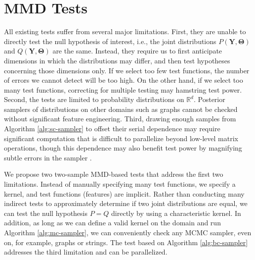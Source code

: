 \documentclass[a4paper,11pt]{article}
\begin{document}
\section{MMD Tests}
All existing tests suffer from several major limitations. First, they are unable to directly test the null hypothesis of interest, i.e., the joint distributions $P(\mathbf{Y}, \mathbf{\Theta})$ and $Q(\mathbf{Y}, \mathbf{\Theta})$ are the same. Instead, they require us to first anticipate dimensions in which the distributions may differ, and then test hypotheses concerning those dimensions only. If we select too few test functions, the number of errors we cannot detect will be too high. On the other hand, if we select too many test functions, correcting for multiple testing may hamstring test power. Second, the tests are limited to probability distributions on $\mathbb{R}^{d}$. Posterior samplers of distributions on other domains such as graphs cannot be checked without significant feature engineering. Third, drawing enough samples from Algorithm \ref{alg:sc-sampler} to offset their serial dependence may require significant computation that is difficult to parallelize beyond low-level matrix operations, though this dependence may also benefit test power by magnifying subtle errors in the sampler \cite{grosse_testing_2014}. 

We propose two two-sample MMD-based tests that address the first two limitations. Instead of manually specifying many test functions, we specify a kernel, and test functions (features) are implicit. Rather than conducting many indirect tests to approximately determine if two joint distributions are equal, we can test the null hypothesis $P=Q$ directly by using a characteristic kernel. In addition, as long as we can define a valid kernel on the domain and run Algorithm \ref{alg:mc-sampler}, we can conveniently check any MCMC sampler, even on, for example, graphs or strings. The test based on Algorithm \ref{alg:bc-sampler} addresses the third limitation and can be parallelized.
\end{document}
